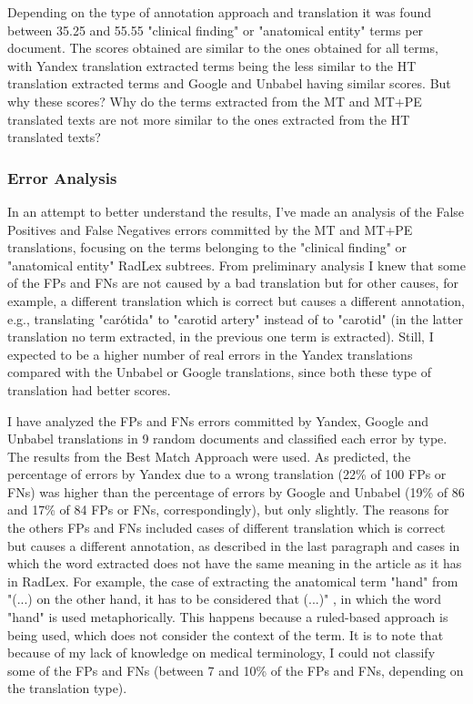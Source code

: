 Depending on the type of annotation approach and translation it was found between 35.25 and 55.55 "clinical finding" or "anatomical entity" terms per document. The scores obtained are similar to the ones obtained for all terms, with Yandex translation extracted terms being the less similar to the HT translation extracted terms and Google and Unbabel having similar scores. But why these scores? Why do the terms extracted from the MT and MT+PE translated texts are not more similar to the ones extracted from the HT translated texts?

\subsubsection{Error Analysis}

In an attempt to better understand the results, I've made an analysis of the False Positives and False Negatives errors committed by the MT and MT+PE translations, focusing on the terms belonging to the "clinical finding" or "anatomical entity" RadLex subtrees. From preliminary analysis I knew that some of the FPs and FNs are not caused by a bad translation but for other causes, for example, a different translation which is correct but causes a different annotation, e.g., translating "carótida" to "carotid artery" instead of to "carotid" (in the latter translation no term extracted, in the previous one term is extracted). Still, I expected to be a higher number of real errors in the Yandex translations compared with the Unbabel or Google translations, since both these type of translation had better scores.

I have analyzed the FPs and FNs errors committed by Yandex, Google and Unbabel translations in 9 random documents and classified each error by type. The results from the Best Match Approach were used. As predicted, the percentage of errors by Yandex due to a wrong translation (22\% of 100 FPs or FNs) was higher than the percentage of errors by Google and Unbabel (19\% of 86 and 17\% of 84 FPs or FNs, correspondingly), but only slightly. The reasons for the others FPs and FNs included cases of different translation which is correct but causes a different annotation, as described in the last paragraph and cases in which the word extracted does not have the same meaning in the article as it has in RadLex. For example, the case of extracting the anatomical term "hand" from "(...) on the other hand, it has to be considered that (...)" , in which the word "hand" is used metaphorically. This happens because a ruled-based approach is being used, which does not consider the context of the term. It is to note that because of my lack of knowledge on medical terminology, I could not classify some of the FPs and FNs (between 7 and 10\% of the FPs and FNs, depending on the translation type). 

